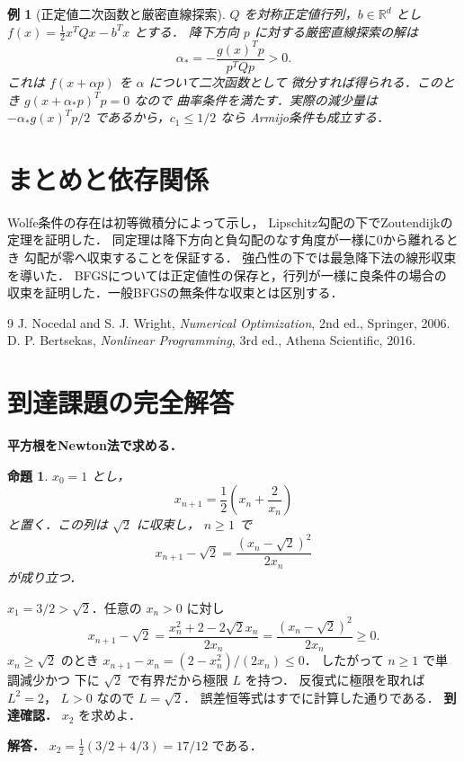 \documentclass[a5paper,10pt,onecolumn]{jsarticle}
\makeatletter
\theoremstyle{mathnotetheorem}
\newtheorem{proposition}[theorem]{命題}
\newtheorem{example}[theorem]{例}
\renewcommand{\proofname}{証明}
\renewenvironment{proof}[1][\proofname]{%
  \par\pushQED{\qed}\normalfont\topsep4\p@\@plus2\p@\relax
  \trivlist\item[\hskip\labelsep\bfseries #1]\ignorespaces
}{\popQED\endtrivlist\@endpefalse}
\makeatother
\begin{document}
\begin{example}[正定値二次函数と厳密直線探索]
$Q$ を対称正定値行列，$b\in\mathbb R^d$ とし
$f(x)=\frac12x^TQx-b^Tx$ とする．
降下方向 $p$ に対する厳密直線探索の解は
\[
 \alpha_*=-\frac{g(x)^Tp}{p^TQp}>0.
\]
これは $f(x+\alpha p)$ を $\alpha$ について二次函数として
微分すれば得られる．このとき
$g(x+\alpha_*p)^Tp=0$ なので
曲率条件を満たす．実際の減少量は
$-\alpha_*g(x)^Tp/2$ であるから，$c_1\le1/2$ なら
Armijo条件も成立する．
\end{example}

\section{まとめと依存関係}
Wolfe条件の存在は初等微積分によって示し，
Lipschitz勾配の下でZoutendijkの定理を証明した．
同定理は降下方向と負勾配のなす角度が一様に0から離れるとき
勾配が零へ収束することを保証する．
強凸性の下では最急降下法の線形収束を導いた．
BFGSについては正定値性の保存と，行列が一様に良条件の場合の
収束を証明した．一般BFGSの無条件な収束とは区別する．

\begin{thebibliography}{9}
 J. Nocedal and S. J. Wright,
 \emph{Numerical Optimization}, 2nd ed., Springer, 2006.
 D. P. Bertsekas,
 \emph{Nonlinear Programming}, 3rd ed., Athena Scientific, 2016.
\end{thebibliography}

\section{到達課題の完全解答}
\noindent\textbf{平方根をNewton法で求める．}
\begin{proposition}
$x_0=1$ とし，
\[
x_{n+1}=\frac12\left(x_n+\frac2{x_n}\right)
\]
と置く．この列は $\sqrt2$ に収束し，
$n\ge1$ で
\[
x_{n+1}-\sqrt2
=\frac{(x_n-\sqrt2)^2}{2x_n}
\]
が成り立つ．
\end{proposition}
\begin{proof}
$x_1=3/2>\sqrt2$．任意の $x_n>0$ に対し
\[
x_{n+1}-\sqrt2
=\frac{x_n^2+2-2\sqrt2x_n}{2x_n}
=\frac{(x_n-\sqrt2)^2}{2x_n}\ge0.
\]
$x_n\ge\sqrt2$ のとき
$x_{n+1}-x_n=(2-x_n^2)/(2x_n)\le0$．
したがって $n\ge1$ で単調減少かつ
下に $\sqrt2$ で有界だから極限 $L$ を持つ．
反復式に極限を取れば $L^2=2$，
$L>0$ なので $L=\sqrt2$．
誤差恒等式はすでに計算した通りである．
\end{proof}
\noindent\textbf{到達確認．}
$x_2$ を求めよ．
\par\noindent\textbf{解答．}
$x_2=\frac12(3/2+4/3)=17/12$ である．
\end{document}
